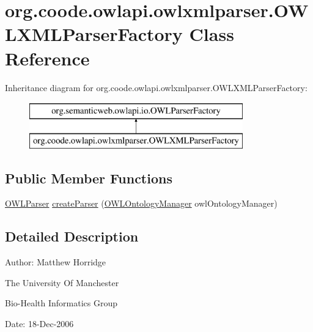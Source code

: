 \hypertarget{classorg_1_1coode_1_1owlapi_1_1owlxmlparser_1_1_o_w_l_x_m_l_parser_factory}{\section{org.\-coode.\-owlapi.\-owlxmlparser.\-O\-W\-L\-X\-M\-L\-Parser\-Factory Class Reference}
\label{classorg_1_1coode_1_1owlapi_1_1owlxmlparser_1_1_o_w_l_x_m_l_parser_factory}
}
Inheritance diagram for org.\-coode.\-owlapi.\-owlxmlparser.\-O\-W\-L\-X\-M\-L\-Parser\-Factory\-:\begin{figure}[H]
\begin{center}
\leavevmode
\includegraphics[height=2.000000cm]{classorg_1_1coode_1_1owlapi_1_1owlxmlparser_1_1_o_w_l_x_m_l_parser_factory}
\end{center}
\end{figure}
\subsection*{Public Member Functions}
\begin{DoxyCompactItemize}
\item 
\hyperlink{interfaceorg_1_1semanticweb_1_1owlapi_1_1io_1_1_o_w_l_parser}{O\-W\-L\-Parser} \hyperlink{classorg_1_1coode_1_1owlapi_1_1owlxmlparser_1_1_o_w_l_x_m_l_parser_factory_ae6159b82c73f79d088eed4b0151accfb}{create\-Parser} (\hyperlink{interfaceorg_1_1semanticweb_1_1owlapi_1_1model_1_1_o_w_l_ontology_manager}{O\-W\-L\-Ontology\-Manager} owl\-Ontology\-Manager)
\end{DoxyCompactItemize}


\subsection{Detailed Description}
Author\-: Matthew Horridge\par
 The University Of Manchester\par
 Bio-\/\-Health Informatics Group\par
 Date\-: 18-\/\-Dec-\/2006\par
\par
 

